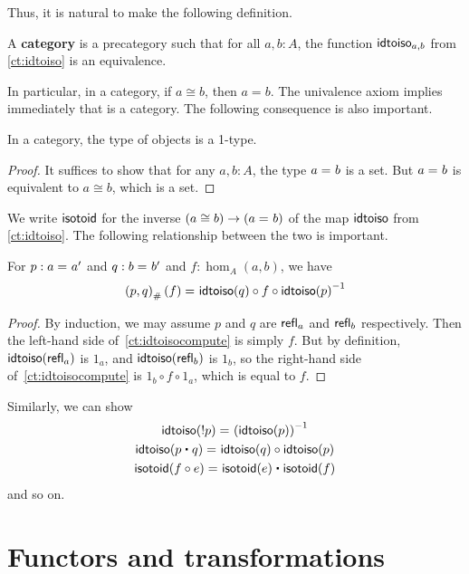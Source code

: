 Thus, it is natural to make the following definition.

\begin{defn}\label{ct:category}
  A \textbf{category} is a precategory such that for all $a,b:A$, the function $\mathsf{idtoiso}_{a,b}$ from \autoref{ct:idtoiso} is an equivalence.
\end{defn}

In particular, in a category, if $a\cong b$, then $a=b$.
The univalence axiom implies immediately that \uset is a category.
The following consequence is also important.

\begin{lem}\label{ct:obj-1type}
  In a category, the type of objects is a 1-type.
\end{lem}
\begin{proof}
  It suffices to show that for any $a,b:A$, the type $a =_{} b$ is a set.
  But $a =_{} b$ is equivalent to $a \cong b$, which is a set.
\end{proof}

We write $\mathsf{isotoid}$ for the inverse $(a\cong b) \to (a =_{} b)$ of the map $\mathsf{idtoiso}$ from \autoref{ct:idtoiso}.
The following relationship between the two is important.

\begin{lem}\label{ct:idtoiso-trans}
  For $p:a =_{} a'$ and $q:b =_{} b'$ and $f:\hom_A(a,b)$, we have
  \begin{equation}\label{ct:idtoisocompute}
    \id{\trans{(p,q)}{f}}
    {\idtoiso(q)\circ f \circ \inv{\idtoiso(p)}}
  \end{equation}
\end{lem}
\begin{proof}
  By induction, we may assume $p$ and $q$ are $\mathsf{refl}_{a}$ and $\mathsf{refl}_{b}$ respectively.
Then the left-hand side of~\eqref{ct:idtoisocompute} is simply $f$.
  But by definition, $\mathsf{idtoiso}(\mathsf{refl}_{a})$ is $1_a$, and $\mathsf{idtoiso}(\mathsf{refl}_{b})$ is $1_b$, so the right-hand side of~\eqref{ct:idtoisocompute} is $1_b\circ f\circ 1_a$, which is equal to $f$.
\end{proof}

Similarly, we can show
\begin{gather}
  \id{\idtoiso(\rev p)}{\inv {(\idtoiso(p))}}\\
  \id{\idtoiso(p\ct q)}{\idtoiso(q)\circ \idtoiso(p)}\\
  \id{\isotoid(f\circ e)}{\isotoid(e)\ct \isotoid(f)}
\end{gather}
and so on.


\section{Functors and transformations}
\label{sec:transfors}

